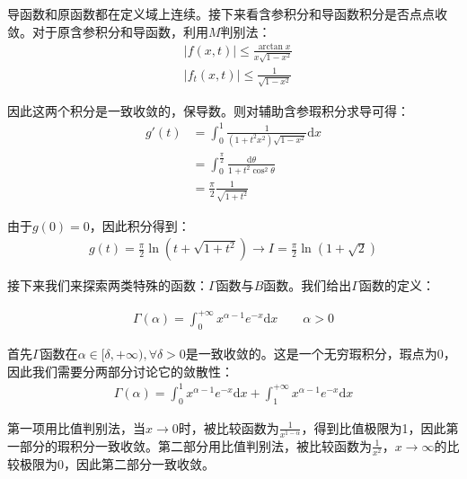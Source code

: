 \documentclass{ctexart}
\begin{document}
导函数和原函数都在定义域上连续。接下来看含参积分和导函数积分是否点点收敛。对于原含参积分和导函数，利用$M$判别法：
\begin{align*}
   & |f(x,t)|\leq\frac{\arctan x}{x\sqrt{1-x^2}}\\
   &|f_t(x,t)|\leq \frac{1}{\sqrt{1-x^2}}
\end{align*}

因此这两个积分是一致收敛的，保导数。则对辅助含参瑕积分求导可得：
\begin{align*}
    g'(t)&=\int_0^1 \frac{1}{(1+t^2x^2)\sqrt{1-x^2}}\mathrm{d}x\\
    &=\int_0^{\frac{\pi}{2}}\frac{\mathrm{d}\theta}{1+t^2\cos^2\theta}\\
    &=\frac{\pi}{2}\frac{1}{\sqrt{1+t^2}}
\end{align*}

由于$g(0)=0$，因此积分得到：
\begin{align*}
    g(t)=\frac{\pi}{2}\ln(t+\sqrt{1+t^2})\to I=\frac{\pi}{2}\ln(1+\sqrt{2})
\end{align*}

接下来我们来探索两类特殊的函数：$\Gamma$函数与$B$函数。我们给出$\Gamma$函数的定义：
\begin{tcolorbox}[
    colback=bac1,     %
    colframe=fra1,   %
    coltitle=white,             %
    coltext=tex1,
    title=$\Gamma$函数的定义,
    fonttitle=\bfseries,        %
    arc=3mm                     %
]
\begin{align*}
    \Gamma(\alpha)=\int_0^{+\infty}x^{\alpha-1}e^{-x}\mathrm{d}x\qquad \alpha>0
\end{align*}
\end{tcolorbox}

首先$\Gamma$函数在$\alpha\in[\delta,+\infty),\forall \delta>0$是一致收敛的。这是一个无穷瑕积分，瑕点为0，因此我们需要分两部分讨论它的敛散性：
\begin{align*}
    \Gamma(\alpha)=\int_0^1 x^{\alpha-1}e^{-x}\mathrm{d}x+ \int_1^{+\infty}x^{\alpha-1}e^{-x}\mathrm{d}x  
\end{align*}

第一项用比值判别法，当$x\to 0$时，被比较函数为$\frac{1}{x^{1-\alpha}}$，得到比值极限为1，因此第一部分的瑕积分一致收敛。第二部分用比值判别法，被比较函数为$\frac{1}{x^2}$，$x\to\infty$的比较极限为0，因此第二部分一致收敛。
\end{document}
